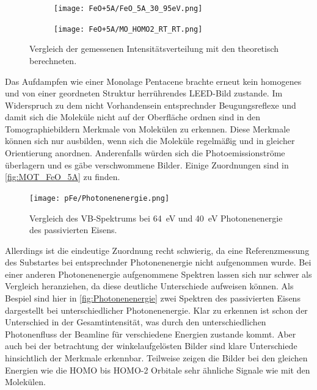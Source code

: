 \begin{figure}
            \centering
            \begin{subfigure}[t]{0.48\textwidth}
                \centering
                \texttt{[image: FeO+5A/FeO\_5A\_30\_95eV.png]}
                \label{fig:MOT_FeO+5A_exp_4}
            \end{subfigure}
            \begin{subfigure}[t]{0.48\textwidth}
                \centering
                \texttt{[image: FeO+5A/MO\_HOMO2\_RT\_RT.png]}
                \label{fig:MOT_FeO+5A_theo_4}
            \end{subfigure}
            \caption{Vergleich der gemessenen Intensitätsverteilung mit den theoretisch berechneten.}
            \label{fig:MOT_FeO_5A}
        \end{figure}
        Das Aufdampfen wie einer Monolage Pentacene brachte erneut kein homogenes und von einer geordneten Struktur herrührendes LEED-Bild zustande.
        Im Widerspruch zu dem nicht Vorhandensein entsprechnder Beugungsreflexe und damit sich die Moleküle nicht auf der Oberfläche ordnen sind in den Tomographiebildern Merkmale von Molekülen zu erkennen.
        Diese Merkmale können sich nur ausbilden, wenn sich die Moleküle regelmäßig und in gleicher Orientierung anordnen.
        Anderenfalls würden sich die Photoemissionströme überlagern und es gäbe verschwommene Bilder.
        Einige Zuordnungen sind in \autoref{fig:MOT_FeO_5A} zu finden.
        \begin{figure}
            \centering
            \texttt{[image: pFe/Photonenenergie.png]}
            \caption{Vergleich des VB-Spektrums bei \SI{64}{\electronvolt} und \SI{40}{\electronvolt} Photonenenergie des passivierten Eisens.}
            \label{fig:Photonenenergie}
        \end{figure}
        Allerdings ist die eindeutige Zuordnung recht schwierig, da eine Referenzmessung des Substartes bei entsprechnder Photonenenergie nicht aufgenommen wurde.
        Bei einer anderen Photonenenergie aufgenommene Spektren lassen sich nur schwer als Vergleich heranziehen, da diese deutliche Unterschiede aufweisen können.
        Als Bespiel sind hier in \autoref{fig:Photonenenergie} zwei Spektren des passivierten Eisens dargestellt bei unterschiedlicher Photonenenergie.
        Klar zu erkennen ist schon der Unterschied in der Gesamtintensität, was durch den unterschiedlichen Photonenfluss der Beamline für verschiedene Energien zustande kommt.
        Aber auch bei der betrachtung der winkelaufgelösten Bilder sind klare Unterschiede hinsichtlich der Merkmale erkennbar.
        Teilweise zeigen die Bilder bei den gleichen Energien wie die HOMO bis HOMO-2 Orbitale sehr ähnliche Signale wie mit den Molekülen.

